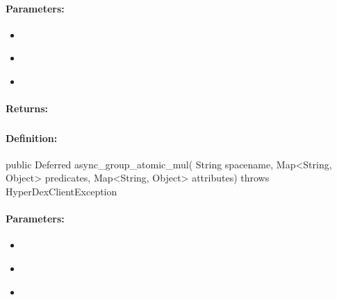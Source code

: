 \paragraph{Parameters:}
\begin{itemize}[noitemsep]
\item {}\\

\item {}\\

\item {}\\

\end{itemize}

\paragraph{Returns:}


\pagebreak
\subsubsection{}
\label{api:java:async_group_atomic_mul}


\paragraph{Definition:}
\begin{javacode}
public Deferred async_group_atomic_mul(
        String spacename,
        Map<String, Object> predicates,
        Map<String, Object> attributes) throws HyperDexClientException
\end{javacode}

\paragraph{Parameters:}
\begin{itemize}[noitemsep]
\item {}\\

\item {}\\

\item {}\\

\end{itemize}

